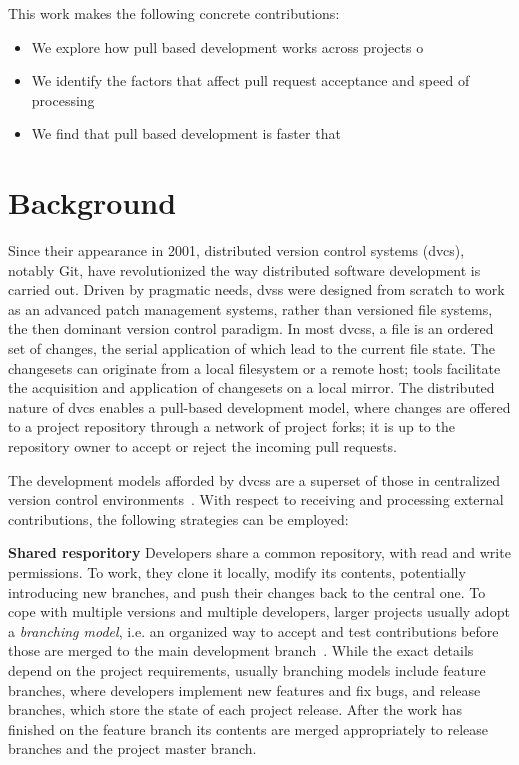 \documentclass{acm_proc_article-sp}
\begin{document}
This work makes the following concrete contributions:

\begin{itemize}

  \item We explore how pull based development works across projects o

  \item We identify the factors that affect pull request acceptance and
    speed of processing

  \item We find that pull based development is faster that 

\end{itemize}


\section{Background} \label{sec:bg} Since their appearance in 2001, distributed
version control systems ({\sc dvcs}), notably Git, have revolutionized the way
distributed software development is carried out. Driven by pragmatic needs, {\sc
dvs}s were designed from scratch to work as an advanced patch management
systems, rather than versioned file systems, the then dominant version control
paradigm. In most {\sc dvcs}s, a file is an ordered set of changes, the serial
application of which lead to the current file state. The changesets can
originate from a local filesystem or a remote host; tools facilitate the
acquisition and application of changesets on a local mirror. The distributed
nature of {\sc dvcs} enables a pull-based development model, where changes are
offered to a project repository through a network of project forks; it is up to
the repository owner to accept or reject the incoming pull requests.

The development models afforded by {\sc dvcs}s are a superset of 
those in centralized version control environments~\cite{Shiha12,Bird09}. 
With respect to receiving and processing external contributions,
the following strategies can be employed:


\textbf{Shared resporitory}
    Developers share a common repository, with read and
    write permissions. To work, they clone it locally, modify its contents,
    potentially introducing new branches, and push their changes back to the
    central one. To cope with multiple versions and multiple developers, larger
    projects usually adopt a {\em branching model}, i.e. an organized way to
    accept and test contributions before those are merged to the main
    development branch~\cite{Bird12}. While the exact details depend on the
    project requirements, usually branching models include feature branches,
    where developers implement new features and fix bugs, and release branches,
    which store the state of each project release. After the work has finished
    on the feature branch its contents are merged appropriately to release
    branches and the project master branch.
\end{document}
